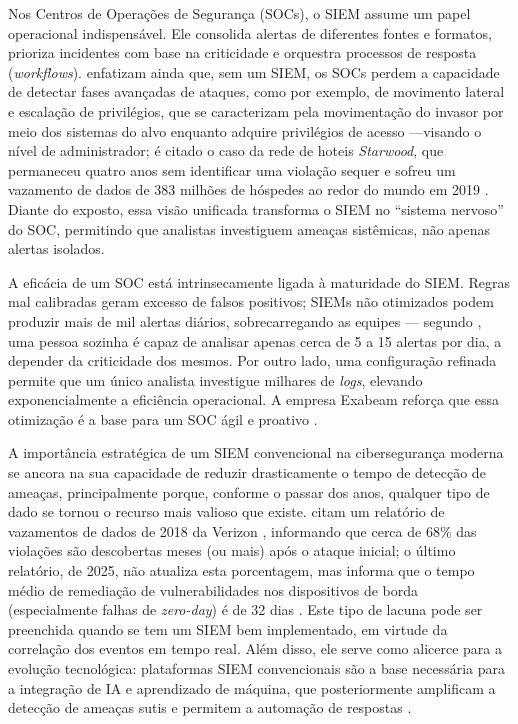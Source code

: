 Nos Centros de Operações de Segurança (SOCs), o SIEM assume um papel operacional indispensável. 
Ele consolida alertas de diferentes fontes e formatos, prioriza incidentes com base na criticidade e orquestra processos de resposta (\textit{workflows}). 
 enfatizam ainda que, sem um SIEM, os SOCs perdem a capacidade de detectar fases avançadas de ataques, como por exemplo, de movimento lateral e escalação de privilégios, que se caracterizam pela movimentação do invasor por meio dos sistemas do alvo enquanto adquire privilégios de acesso ---visando o nível de administrador; 
é citado o caso da rede de hoteis \textit{Starwood}, que permaneceu quatro anos sem identificar uma violação sequer e sofreu um vazamento de dados de 383 milhões de hóspedes ao redor do mundo em 2019 \cite{Marriot}. 
Diante do exposto, essa visão unificada transforma o SIEM no ``sistema nervoso'' do SOC, permitindo que analistas investiguem ameaças sistêmicas, não apenas alertas isolados. 

A eficácia de um SOC está intrinsecamente ligada à maturidade do SIEM. 
Regras mal calibradas geram excesso de falsos positivos; 
SIEMs não otimizados podem produzir mais de mil alertas diários, sobrecarregando as equipes --- segundo , uma pessoa sozinha é capaz de analisar apenas cerca de 5 a 15 alertas por dia, a depender da criticidade dos mesmos. 
Por outro lado, uma configuração refinada permite que um único analista investigue milhares de \textit{logs}, elevando exponencialmente a eficiência operacional. 
A empresa Exabeam reforça que essa otimização é a base para um SOC ágil e proativo \cite{Exabeam1}.

A importância estratégica de um SIEM convencional na cibersegurança moderna se ancora na sua capacidade de reduzir drasticamente o tempo de detecção de ameaças, principalmente porque, conforme o passar dos anos, qualquer tipo de dado se tornou o recurso mais valioso que existe. 
 citam um relatório de vazamentos de dados de 2018 da Verizon \cite{verizon2018dbir}, informando que cerca de 68\% das violações são descobertas meses (ou mais) após o ataque inicial; 
o último relatório, de 2025, não atualiza esta porcentagem, mas informa que o tempo médio de remediação de vulnerabilidades nos dispositivos de borda (especialmente falhas de \textit{zero-day}) é de 32 dias \cite{verizon2025dbir}. 
Este tipo de lacuna pode ser preenchida quando se tem um SIEM bem implementado, em virtude da correlação dos eventos em tempo real. 
Além disso, ele serve como alicerce para a evolução tecnológica: plataformas SIEM convencionais são a base necessária para a integração de IA e aprendizado de máquina, que posteriormente amplificam a detecção de ameaças sutis e permitem a automação de respostas \cite{PaloAlto1}.

